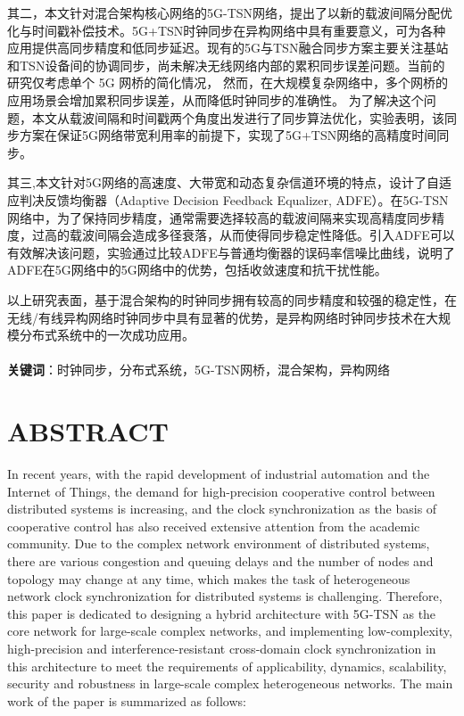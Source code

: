 \documentclass[UTF8,a4paper,12pt]{ctexart}
\numberwithin{equation}{section}
\begin{document}
其二，本文针对混合架构核心网络的5G-TSN网络，提出了以新的载波间隔分配优化与时间戳补偿技术。5G+TSN时钟同步在异构网络中具有重要意义，可为各种应用提供高同步精度和低同步延迟。现有的5G与TSN融合同步方案主要关注基站和TSN设备间的协调同步，尚未解决无线网络内部的累积同步误差问题。当前的研究仅考虑单个 5G 网桥的简化情况， 然而，在大规模复杂网络中，多个网桥的应用场景会增加累积同步误差，从而降低时钟同步的准确性。 为了解决这个问题，本文从载波间隔和时间戳两个角度出发进行了同步算法优化，实验表明，该同步方案在保证5G网络带宽利用率的前提下，实现了5G+TSN网络的高精度时间同步。

其三,本文针对5G网络的高速度、大带宽和动态复杂信道环境的特点，设计了自适应判决反馈均衡器（Adaptive Decision Feedback Equalizer, ADFE）。在5G-TSN网络中，为了保持同步精度，通常需要选择较高的载波间隔来实现高精度同步精度，过高的载波间隔会造成多径衰落，从而使得同步稳定性降低。引入ADFE可以有效解决该问题，实验通过比较ADFE与普通均衡器的误码率信噪比曲线，说明了ADFE在5G网络中的5G网络中的优势，包括收敛速度和抗干扰性能。

以上研究表面，基于混合架构的时钟同步拥有较高的同步精度和较强的稳定性，在无线/有线异构网络时钟同步中具有显著的优势，是异构网络时钟同步技术在大规模分布式系统中的一次成功应用。
\hspace{8mm}\\
~\\
\textbf{关键词}：时钟同步，分布式系统，5G-TSN网桥，混合架构，异构网络\\

\newpage
{}
\section*{ABSTRACT}

In recent years, with the rapid development of industrial automation and the Internet of Things, the demand for high-precision cooperative control between distributed systems is increasing, and the clock synchronization as the basis of cooperative control has also received extensive attention from the academic community. Due to the complex network environment of distributed systems, there are various congestion and queuing delays and the number of nodes and topology may change at any time, which makes the task of heterogeneous network clock synchronization for distributed systems is challenging. Therefore, this paper is dedicated to designing a hybrid architecture with 5G-TSN as the core network for large-scale complex networks, and implementing low-complexity, high-precision and interference-resistant cross-domain clock synchronization in this architecture to meet the requirements of applicability, dynamics, scalability, security and robustness in large-scale complex heterogeneous networks. The main work of the paper is summarized as follows:
\end{document}
